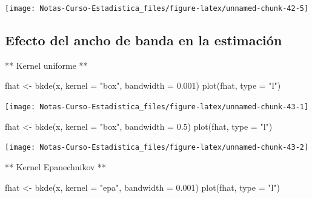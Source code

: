 \documentclass[
  12pt,
]{book}
\newenvironment{Shaded}{\begin{snugshade}}{\end{snugshade}}
\newcommand{\AttributeTok}[1]{\textcolor[rgb]{0.77,0.63,0.00}{#1}}
\newcommand{\FloatTok}[1]{\textcolor[rgb]{0.00,0.00,0.81}{#1}}
\newcommand{\FunctionTok}[1]{\textcolor[rgb]{0.00,0.00,0.00}{#1}}
\newcommand{\NormalTok}[1]{#1}
\newcommand{\OtherTok}[1]{\textcolor[rgb]{0.56,0.35,0.01}{#1}}
\newcommand{\StringTok}[1]{\textcolor[rgb]{0.31,0.60,0.02}{#1}}
\theoremstyle{definition}
\theoremstyle{definition}
\theoremstyle{definition}
\theoremstyle{remark}
\begin{document}
\begin{center}\texttt{[image: Notas-Curso-Estadistica\_files/figure-latex/unnamed-chunk-42-5]} \end{center}

\hypertarget{efecto-del-ancho-de-banda-en-la-estimaciuxf3n}{%
\subsection{Efecto del ancho de banda en la estimación}\label{efecto-del-ancho-de-banda-en-la-estimaciuxf3n}}

** Kernel uniforme **

\begin{Shaded}
\begin{Highlighting}[]
\NormalTok{fhat }\OtherTok{\textless{}{-}} \FunctionTok{bkde}\NormalTok{(x, }\AttributeTok{kernel =} \StringTok{"box"}\NormalTok{, }\AttributeTok{bandwidth =} \FloatTok{0.001}\NormalTok{)}
\FunctionTok{plot}\NormalTok{(fhat, }\AttributeTok{type =} \StringTok{"l"}\NormalTok{)}
\end{Highlighting}
\end{Shaded}

\begin{center}\texttt{[image: Notas-Curso-Estadistica\_files/figure-latex/unnamed-chunk-43-1]} \end{center}

\begin{Shaded}
\begin{Highlighting}[]
\NormalTok{fhat }\OtherTok{\textless{}{-}} \FunctionTok{bkde}\NormalTok{(x, }\AttributeTok{kernel =} \StringTok{"box"}\NormalTok{, }\AttributeTok{bandwidth =} \FloatTok{0.5}\NormalTok{)}
\FunctionTok{plot}\NormalTok{(fhat, }\AttributeTok{type =} \StringTok{"l"}\NormalTok{)}
\end{Highlighting}
\end{Shaded}

\begin{center}\texttt{[image: Notas-Curso-Estadistica\_files/figure-latex/unnamed-chunk-43-2]} \end{center}

** Kernel Epanechnikov **

\begin{Shaded}
\begin{Highlighting}[]
\NormalTok{fhat }\OtherTok{\textless{}{-}} \FunctionTok{bkde}\NormalTok{(x, }\AttributeTok{kernel =} \StringTok{"epa"}\NormalTok{, }\AttributeTok{bandwidth =} \FloatTok{0.001}\NormalTok{)}
\FunctionTok{plot}\NormalTok{(fhat, }\AttributeTok{type =} \StringTok{"l"}\NormalTok{)}
\end{Highlighting}
\end{Shaded}
\end{document}
